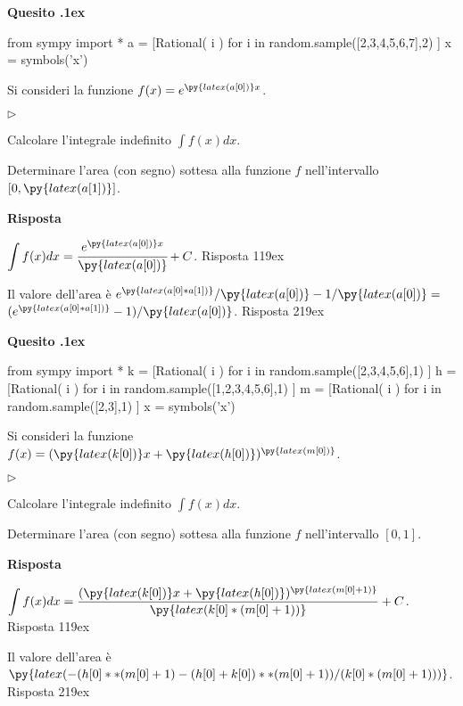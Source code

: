 \documentclass[11pt,twoside,a4paper]{article}
\newcommand{\mylabel}[1]{#1\hfill}
\renewenvironment{itemize}
  {\begin{list}{$\triangleright$}{%
   \setlength{\parskip}{0mm}
   \setlength{\topsep}{.4\baselineskip}
   \setlength{\rightmargin}{0mm}
   \setlength{\listparindent}{0mm}
   \setlength{\itemindent}{0mm}
   \setlength{\labelwidth}{2ex}
   \setlength{\itemsep}{.4\baselineskip}
   \setlength{\parsep}{0mm}
   \setlength{\partopsep}{0mm}
   \setlength{\labelsep}{1ex}
   \setlength{\leftmargin}{\labelwidth+\labelsep}
   \let\makelabel\mylabel}}{%
   \end{list}\vspace*{-1.3mm}}
\newcounter{quesito}
\newenvironment{question}{\bigskip\addtocounter{quesito}{1}\bigskip\bigskip\par\textbf{Quesito \thequesito.\kern1ex}}{\vspace{\parskip}}
\newenvironment{answer}{\par\textbf{Risposta\quad}}{\vspace{\parskip}}
\begin{document}
\begin{question}
\begin{pycode}
from sympy import *
a = [Rational( i ) for i in random.sample([2,3,4,5,6,7],2) ]
x = symbols('x')
\end{pycode}
Si consideri la funzione $f(x) = e^{\py{latex(a[0])}x}$.
\begin{itemize}
\item[1.] Calcolare l'integrale indefinito $\displaystyle \int f(x) dx$.
\item[2.] Determinare l'area (con segno) sottesa alla funzione $f$ nell'intervallo $[0,\py{latex(a[1])}]$.
\end{itemize}
\begin{answer}

{\color{blue}
$\displaystyle \int f(x) dx = \cfrac{e^{\py{latex(a[0])}x}}{\py{latex(a[0])}} + C$.
\hfill Risposta 1\kern19ex}

\smallskip
{\color{blue} Il valore dell'area è} $e^{\py{latex(a[0]*a[1])}}/\py{latex(a[0])} - 1/\py{latex(a[0])}=$ {\color{blue}$(e^{\py{latex(a[0]*a[1])}}-1)/\py{latex(a[0])}$.
\hfill Risposta 2\kern19ex}

\end{answer}
\end{question}
\begin{question}
\begin{pycode}
from sympy import *
k = [Rational( i ) for i in random.sample([2,3,4,5,6],1) ]
h = [Rational( i ) for i in random.sample([1,2,3,4,5,6],1) ]
m = [Rational( i ) for i in random.sample([2,3],1) ]
x = symbols('x')
\end{pycode}
Si consideri la funzione $f(x) = (\py{latex(k[0])}x+\py{latex(h[0])})^{\py{latex(m[0])}}$.
\begin{itemize}
\item[1.] Calcolare l'integrale indefinito $\displaystyle \int f(x) dx$.
\item[2.] Determinare l'area (con segno) sottesa alla funzione $f$ nell'intervallo $[0,1]$.
\end{itemize}
\begin{answer}

{\color{blue}
$\displaystyle \int f(x) dx = \frac{(\py{latex(k[0])}x+\py{latex(h[0])})^{\py{latex(m[0]+1)}}}{\py{latex(k[0]*(m[0]+1))}} + C$.
\hfill Risposta 1\kern19ex}

\smallskip
{\color{blue} Il valore dell'area è $\py{latex(-(h[0]**(m[0]+1)-(h[0]+k[0])**(m[0]+1))/(k[0]*(m[0]+1)))}$.
\hfill Risposta 2\kern19ex}

\end{answer}
\end{question}
\end{document}
